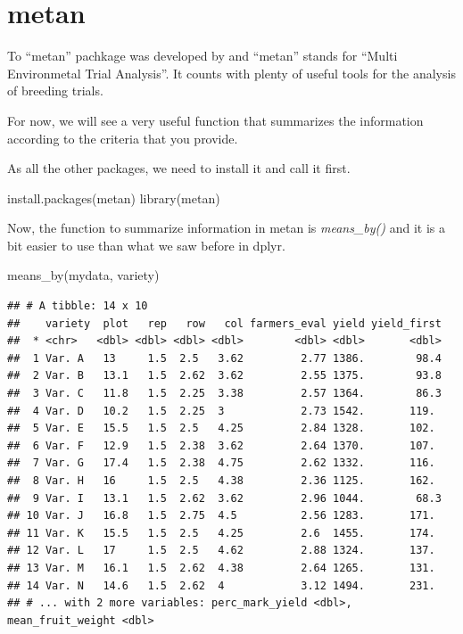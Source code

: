 \documentclass[
]{book}
\newenvironment{Shaded}{\begin{snugshade}}{\end{snugshade}}
\newcommand{\FunctionTok}[1]{\textcolor[rgb]{0.00,0.00,0.00}{#1}}
\newcommand{\NormalTok}[1]{#1}
\newcommand{\StringTok}[1]{\textcolor[rgb]{0.31,0.60,0.02}{#1}}
\begin{document}
\hypertarget{metan}{%
\section{metan}\label{metan}}

To ``metan'' pachkage was developed by \citet{Olivoto2020} and ``metan'' stands for ``Multi Environmetal Trial Analysis''. It counts with plenty of useful tools for the analysis of breeding trials.

For now, we will see a very useful function that summarizes the information according to the criteria that you provide.

As all the other packages, we need to install it and call it first.

\begin{Shaded}
\begin{Highlighting}[]
\FunctionTok{install.packages}\NormalTok{(}\StringTok{\textquotesingle{}metan\textquotesingle{}}\NormalTok{)}
\FunctionTok{library}\NormalTok{(metan)}
\end{Highlighting}
\end{Shaded}

Now, the function to summarize information in metan is \emph{means\_by()} and it is a bit easier to use than what we saw before in dplyr.

\begin{Shaded}
\begin{Highlighting}[]
\FunctionTok{means\_by}\NormalTok{(mydata, variety)}
\end{Highlighting}
\end{Shaded}

\begin{verbatim}
## # A tibble: 14 x 10
##    variety  plot   rep   row   col farmers_eval yield yield_first
##  * <chr>   <dbl> <dbl> <dbl> <dbl>        <dbl> <dbl>       <dbl>
##  1 Var. A   13     1.5  2.5   3.62         2.77 1386.        98.4
##  2 Var. B   13.1   1.5  2.62  3.62         2.55 1375.        93.8
##  3 Var. C   11.8   1.5  2.25  3.38         2.57 1364.        86.3
##  4 Var. D   10.2   1.5  2.25  3            2.73 1542.       119. 
##  5 Var. E   15.5   1.5  2.5   4.25         2.84 1328.       102. 
##  6 Var. F   12.9   1.5  2.38  3.62         2.64 1370.       107. 
##  7 Var. G   17.4   1.5  2.38  4.75         2.62 1332.       116. 
##  8 Var. H   16     1.5  2.5   4.38         2.36 1125.       162. 
##  9 Var. I   13.1   1.5  2.62  3.62         2.96 1044.        68.3
## 10 Var. J   16.8   1.5  2.75  4.5          2.56 1283.       171. 
## 11 Var. K   15.5   1.5  2.5   4.25         2.6  1455.       174. 
## 12 Var. L   17     1.5  2.5   4.62         2.88 1324.       137. 
## 13 Var. M   16.1   1.5  2.62  4.38         2.64 1265.       131. 
## 14 Var. N   14.6   1.5  2.62  4            3.12 1494.       231. 
## # ... with 2 more variables: perc_mark_yield <dbl>, mean_fruit_weight <dbl>
\end{verbatim}
\end{document}
